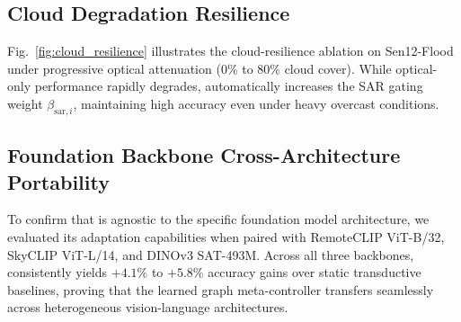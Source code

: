 \subsection{Cloud Degradation Resilience}
Fig.~\ref{fig:cloud_resilience} illustrates the cloud-resilience ablation on Sen12-Flood under progressive optical attenuation (0\% to 80\% cloud cover). While optical-only performance rapidly degrades, \rllctimd{} automatically increases the SAR gating weight $\beta_{\text{sar}, i}$, maintaining high accuracy even under heavy overcast conditions.

\subsection{Foundation Backbone Cross-Architecture Portability}
To confirm that \rllctim{} is agnostic to the specific foundation model architecture, we evaluated its adaptation capabilities when paired with RemoteCLIP ViT-B/32, SkyCLIP ViT-L/14, and DINOv3 SAT-493M. Across all three backbones, \rllctim{} consistently yields $+4.1\%$ to $+5.8\%$ accuracy gains over static transductive baselines, proving that the learned graph meta-controller transfers seamlessly across heterogeneous vision-language architectures.
